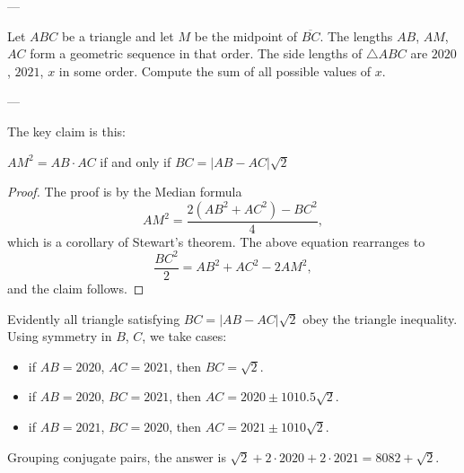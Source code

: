 
---

Let $ABC$ be a triangle and let $M$ be the midpoint of $\overline{BC}$. The lengths $AB$, $AM$, $AC$ form a geometric sequence in that order. The side lengths of $\triangle ABC$ are $2020$, $2021$, $x$ in some order. Compute the sum of all possible values of $x$.

---

The key claim is this:
\begin{claim*}
    $AM^2=AB\cdot AC$ if and only if $BC=\lvert AB-AC\rvert\sqrt2$
\end{claim*}
\begin{proof}
    The proof is by the Median formula \[AM^2=\frac{2\left(AB^2+AC^2\right)-BC^2}4,\]
    which is a corollary of Stewart's theorem. The above equation rearranges to \[\frac{BC^2}2=AB^2+AC^2-2AM^2,\]
    and the claim follows.
\end{proof}

Evidently all triangle satisfying $BC=\lvert AB-AC\rvert\sqrt2$ obey the triangle inequality. Using symmetry in $B$, $C$, we take cases:
\begin{itemize}[itemsep=0em]
    \item if $AB=2020$, $AC=2021$, then $BC=\sqrt2$.
    \item if $AB=2020$, $BC=2021$, then $AC=2020\pm1010.5\sqrt2$.
    \item if $AB=2021$, $BC=2020$, then $AC=2021\pm1010\sqrt2$.
\end{itemize}
Grouping conjugate pairs, the answer is $\sqrt2+2\cdot2020+2\cdot2021=8082+\sqrt2$.

